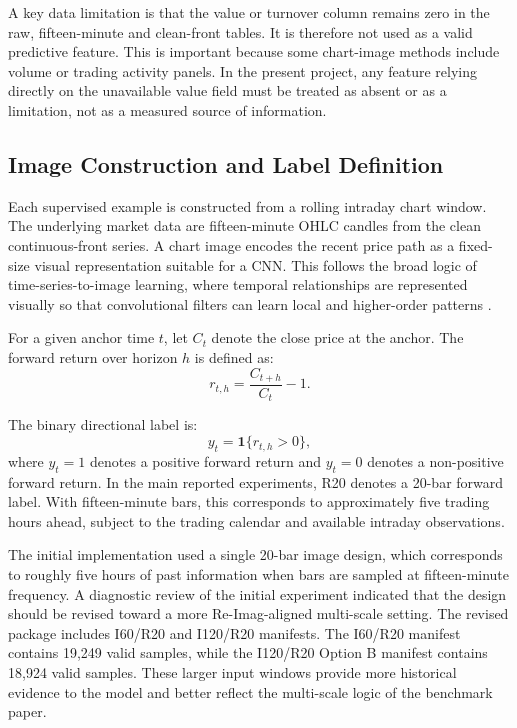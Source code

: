 A key data limitation is that the value or turnover column remains zero in the raw, fifteen-minute and clean-front tables. It is therefore not used as a valid predictive feature. This is important because some chart-image methods include volume or trading activity panels. In the present project, any feature relying directly on the unavailable value field must be treated as absent or as a limitation, not as a measured source of information.

\subsection{Image Construction and Label Definition}
\label{subsec:image_label}





Each supervised example is constructed from a rolling intraday chart window. The underlying market data are fifteen-minute OHLC candles from the clean continuous-front series. A chart image encodes the recent price path as a fixed-size visual representation suitable for a CNN. This follows the broad logic of time-series-to-image learning, where temporal relationships are represented visually so that convolutional filters can learn local and higher-order patterns \cite{wang_oates_imaging_time_series,sezer_ozbayoglu_tsi}.

For a given anchor time \(t\), let \(C_t\) denote the close price at the anchor. The forward return over horizon \(h\) is defined as:
\begin{equation}
r_{t,h} = \frac{C_{t+h}}{C_t} - 1 .
\label{eq:forward_return}
\end{equation}

The binary directional label is:
\begin{equation}
y_t = \mathbf{1}\{r_{t,h} > 0\},
\label{eq:label}
\end{equation}
where \(y_t=1\) denotes a positive forward return and \(y_t=0\) denotes a non-positive forward return. In the main reported experiments, R20 denotes a 20-bar forward label. With fifteen-minute bars, this corresponds to approximately five trading hours ahead, subject to the trading calendar and available intraday observations.

The initial implementation used a single 20-bar image design, which corresponds to roughly five hours of past information when bars are sampled at fifteen-minute frequency. A diagnostic review of the initial experiment indicated that the design should be revised toward a more Re-Imag-aligned multi-scale setting. The revised package includes I60/R20 and I120/R20 manifests. The I60/R20 manifest contains 19,249 valid samples, while the I120/R20 Option B manifest contains 18,924 valid samples. These larger input windows provide more historical evidence to the model and better reflect the multi-scale logic of the benchmark paper.

